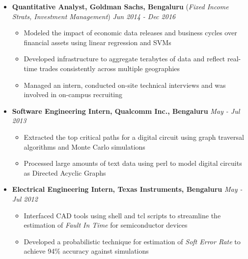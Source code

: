 \documentclass[10pt,a4paper,English]{article}
\newcommand\itemyear[1]{\hfill \emph{\color{itemyear} #1}}
\newcommand\itemenv{\setlength\itemsep{0.5pt} \addtolength{\itemindent}{-5mm}\vspace{-1.5mm}}
\begin{document}
\begin{itemize}
    \item \textbf{Quantitative Analyst, Goldman Sachs, Bengaluru} \hfill (\emph{Fixed Income Strats, Investment Management}) \itemyear{Jun 2014 - Dec 2016}
        \begin{itemize} \itemenv
            \item Modeled the impact of economic data releases and business cycles over financial assets using linear regression and SVMs
            \item Developed infrastructure to aggregate terabytes of data and reflect real-time trades consistently across multiple geographies
            \item Managed an intern, conducted on-site technical interviews and was involved in on-campus recruiting
        \end{itemize}

    \item \textbf{Software Engineering Intern, Qualcomm Inc., Bengaluru} \itemyear{May - Jul 2013}
        \begin{itemize} \itemenv
            \item Extracted the top critical paths for a digital circuit using graph traversal algorithms and Monte Carlo simulations
            \item Processed large amounts of text data using perl to model digital circuits as Directed Acyclic Graphs
        \end{itemize}

    \item \textbf{Electrical Engineering Intern, Texas Instruments, Bengaluru} \itemyear{May - Jul 2012}
        \begin{itemize} \itemenv
            \item Interfaced CAD tools using shell and tcl scripts to streamline the estimation of \textit{Fault In Time} for semiconductor devices
            \item Developed a probabilistic technique for estimation of \emph{Soft Error Rate} to achieve 94\% accuracy against simulations
        \end{itemize}


\end{itemize}
\end{document}
